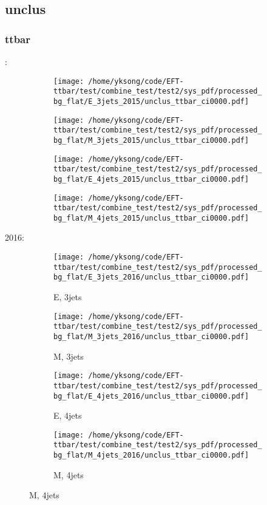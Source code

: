 \documentclass{beamer}
\begin{document}
\subsection{unclus}

\begin{frame}
\frametitle{ttbar}
\fontsize{5}{1}:
\begin{figure}
\centering
\begin{subfigure}[b]{0.24\textwidth}
\texttt{[image: /home/yksong/code/EFT-ttbar/test/combine\_test/test2/sys\_pdf/processed\_bg\_flat/E\_3jets\_2015/unclus\_ttbar\_ci0000.pdf]}
\end{subfigure}
\begin{subfigure}[b]{0.24\textwidth}
\texttt{[image: /home/yksong/code/EFT-ttbar/test/combine\_test/test2/sys\_pdf/processed\_bg\_flat/M\_3jets\_2015/unclus\_ttbar\_ci0000.pdf]}
\end{subfigure}
\begin{subfigure}[b]{0.24\textwidth}
\texttt{[image: /home/yksong/code/EFT-ttbar/test/combine\_test/test2/sys\_pdf/processed\_bg\_flat/E\_4jets\_2015/unclus\_ttbar\_ci0000.pdf]}
\end{subfigure}
\begin{subfigure}[b]{0.24\textwidth}
\texttt{[image: /home/yksong/code/EFT-ttbar/test/combine\_test/test2/sys\_pdf/processed\_bg\_flat/M\_4jets\_2015/unclus\_ttbar\_ci0000.pdf]}
\end{subfigure}
\end{figure}
2016:
\begin{figure}
\centering
\begin{subfigure}[b]{0.24\textwidth}
\texttt{[image: /home/yksong/code/EFT-ttbar/test/combine\_test/test2/sys\_pdf/processed\_bg\_flat/E\_3jets\_2016/unclus\_ttbar\_ci0000.pdf]}
\captionsetup{font=tiny}
\caption{E, 3jets}
\end{subfigure}
\begin{subfigure}[b]{0.24\textwidth}
\texttt{[image: /home/yksong/code/EFT-ttbar/test/combine\_test/test2/sys\_pdf/processed\_bg\_flat/M\_3jets\_2016/unclus\_ttbar\_ci0000.pdf]}
\captionsetup{font=tiny}
\caption{M, 3jets}
\end{subfigure}
\begin{subfigure}[b]{0.24\textwidth}
\texttt{[image: /home/yksong/code/EFT-ttbar/test/combine\_test/test2/sys\_pdf/processed\_bg\_flat/E\_4jets\_2016/unclus\_ttbar\_ci0000.pdf]}
\captionsetup{font=tiny}
\caption{E, 4jets}
\end{subfigure}
\begin{subfigure}[b]{0.24\textwidth}
\texttt{[image: /home/yksong/code/EFT-ttbar/test/combine\_test/test2/sys\_pdf/processed\_bg\_flat/M\_4jets\_2016/unclus\_ttbar\_ci0000.pdf]}
\captionsetup{font=tiny}
\caption{M, 4jets}
\end{subfigure}
\end{figure}
\end{frame}
\end{document}
